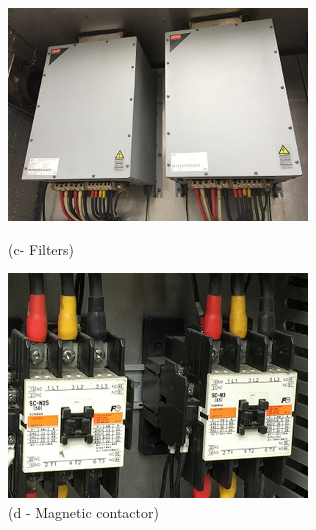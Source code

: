 \begin{figure}[!h]
\begin{minipage}[b]{0.22\linewidth}
	\end{minipage}
	\hspace{0.03cm}
	\begin{minipage}[b]{0.22\linewidth}
		\centering
		\includegraphics[width=\textwidth]{figures/fig_ch04_elecaudit_visualinspection_filter}
		\caption*{(c- Filters)}
	\end{minipage}
	\hspace{0.03cm}
	\begin{minipage}[b]{0.22\linewidth}
		\centering
		\includegraphics[width=\textwidth]{figures/fig_ch04_elecaudit_visualinspection_magnetic_contactor}
		\caption*{(d - Magnetic contactor)}	
	\end{minipage}

\end{figure}
